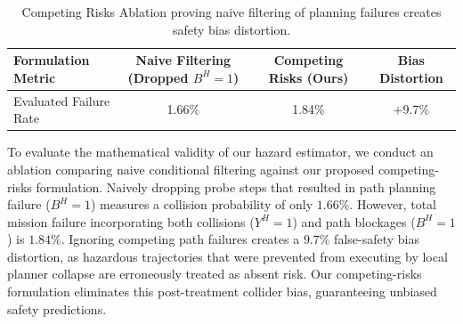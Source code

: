 
\begin{table}[t]
\centering
\caption{Competing Risks Ablation proving naive filtering of planning failures creates safety bias distortion.}
\label{tab:competing_risks_ablation}
\footnotesize
\begin{tabularx}{\columnwidth}{@{}X c c c@{}}
\toprule
\textbf{Formulation Metric} & \textbf{Naive Filtering (Dropped $B^H=1$)} & \textbf{Competing Risks (Ours)} & \textbf{Bias Distortion} \\
\midrule
Evaluated Failure Rate & 1.66\% & 1.84\% & +9.7\% \\
\bottomrule
\end{tabularx}
\end{table}

To evaluate the mathematical validity of our hazard estimator, we conduct an ablation comparing naive conditional filtering against our proposed competing-risks formulation. Naively dropping probe steps that resulted in path planning failure ($B^H=1$) measures a collision probability of only $1.66\%$. However, total mission failure incorporating both collisions ($Y^H=1$) and path blockages ($B^H=1$) is $1.84\%$. Ignoring competing path failures creates a $9.7\%$ false-safety bias distortion, as hazardous trajectories that were prevented from executing by local planner collapse are erroneously treated as absent risk. Our competing-risks formulation eliminates this post-treatment collider bias, guaranteeing unbiased safety predictions.
